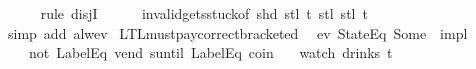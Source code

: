 \begin{isabellebody}
\ \ \ \ \isamarkupfalse%
\ {\isacharparenleft}rule\ disjI{}{\isacharparenright}\isanewline
\ \ \ \ \isamarkupfalse%
\ invalid{\isacharunderscore}gets{\isacharunderscore}stuck{\isacharbrackleft}of\ {\isachardoublequoteopen}shd\ {\isacharparenleft}stl\ t{\isacharparenright}{\isachardoublequoteclose}\ {\isachardoublequoteopen}stl\ {\isacharparenleft}stl\ t{\isacharparenright}{\isachardoublequoteclose}{\isacharbrackright}\isanewline
\ \ \ \ \isamarkupfalse%
\ {\isacharparenleft}simp\ add{\isacharcolon}\ alw{\isacharunderscore}ev{\isacharparenright}\isanewline
{}\isamarkupfalse%
%
\endisatagproof
{\isafoldproof}%
%
\isadelimproof
\isanewline
%
\endisadelimproof
\isanewline
\isanewline
{}\isamarkupfalse%
\ LTL{\isacharunderscore}must{\isacharunderscore}pay{\isacharunderscore}correct{\isacharunderscore}bracketed{\isacharcolon}\isanewline
\ \ {\isachardoublequoteopen}{\isacharparenleft}{\isacharparenleft}ev\ {\isacharparenleft}StateEq\ {\isacharparenleft}Some\ {}{\isacharparenright}{\isacharparenright}{\isacharparenright}\ impl\isanewline
\ \ \ \ {\isacharparenleft}{\isacharparenleft}not\ {\isacharparenleft}LabelEq\ {\isacharprime}{\isacharprime}vend{\isacharprime}{\isacharprime}{\isacharparenright}{\isacharparenright}\ suntil\ LabelEq\ {\isacharprime}{\isacharprime}coin{\isacharprime}{\isacharprime}{\isacharparenright}{\isacharparenright}\isanewline
\ \ \ {\isacharparenleft}watch\ drinks\ t{\isacharparenright}{\isachardoublequoteclose}\isanewline
%
\isadelimproof
\ \ %
\endisadelimproof
%
\isatagproof
{}\isamarkupfalse%
%
\endisatagproof
{\isafoldproof}%
%
\isadelimproof
%
\endisadelimproof
%
\end{isabellebody}
